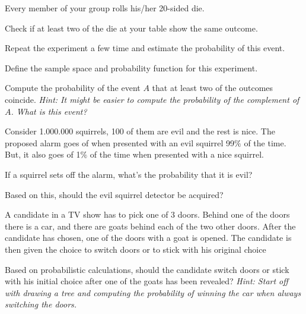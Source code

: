 \documentclass[10pt, a5paper]{scrartcl}
\begin{document}
\boardquestions

\begin{exercise}
  
  \begin{subex}
    Every member of your group rolls his/her 20-sided die.	
  \end{subex}
  
  \begin{subex}
    Check if at least two of the die at your table show the same outcome.
  \end{subex}
  
  \begin{subex}
    Repeat the experiment a few time and estimate the probability of this
    event.  	
  \end{subex}
  
  \begin{subex}
    Define the sample space and probability function for this experiment.	
  \end{subex}
  
  \begin{subex}
    Compute the probability of the event $A$ that at least two of the outcomes
    coincide. \emph{Hint: It might be easier to compute the probability of the 
    complement of $A$. What is this event?}
  \end{subex}
\end{exercise}


\begin{exercise}
  Consider 1.000.000 squirrels, 100 of them are evil and the rest is nice. The
  proposed alarm goes of when presented with an evil squirrel 99$\%$ of the
  time. But, it also goes of 1$\%$ of the time when presented with a nice
  squirrel.
  
  \begin{subex}
    If a squirrel sets off the alarm, what's the probability that it is evil?
  \end{subex}
  
  \begin{subex}
    Based on this, should the evil squirrel detector be acquired?
  \end{subex}
\end{exercise}


\begin{exercise}
  A candidate in a TV show has to pick one of 3 doors. Behind one of the doors
  there is a car, and there are goats behind each of the two other doors. After
  the candidate has chosen, one of the doors with a goat is opened. The
  candidate is then given the choice to switch doors or to stick with his
  original choice

  Based on probabilistic calculations, should the	candidate switch doors or
  stick with his initial choice after one of the goats has been revealed?
  \emph{Hint: Start off with drawing a tree and computing the probability of
  winning the car when always switching the doors.}
\end{exercise}

\vfill\creditsboardquestions
\end{document}
